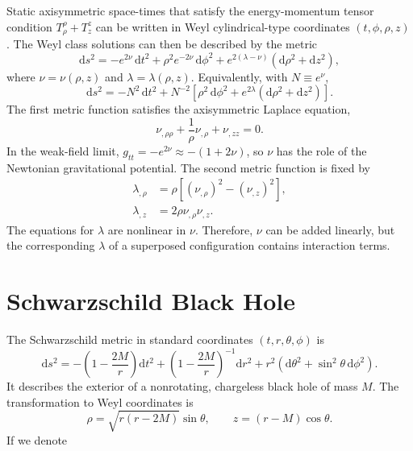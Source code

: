 Static axisymmetric space-times that satisfy the energy-momentum tensor condition $T_\rho^\rho + T^z_z$ can be written in Weyl cylindrical-type coordinates
\((t,\phi,\rho,z)\) \cite{Basovnik2010}. The Weyl class solutions can then be described by the metric
\begin{equation}
    \mathrm{d}s^2
    =
    -e^{2\nu}\,\mathrm{d}t^2
    +
    \rho^2 e^{-2\nu}\,\mathrm{d}\phi^2
    +
    e^{2(\lambda-\nu)}
    \left(
        \mathrm{d}\rho^2+\mathrm{d}z^2
    \right),
    \label{eq:weyl-metric}
\end{equation}
where \(\nu=\nu(\rho,z)\) and \(\lambda=\lambda(\rho,z)\). Equivalently,
with \(N\equiv e^\nu\),
\begin{equation}
    \mathrm{d}s^2
    =
    -N^2\,\mathrm{d}t^2
    +
    N^{-2}
    \left[
        \rho^2\,\mathrm{d}\phi^2
        +
        e^{2\lambda}
        \left(
            \mathrm{d}\rho^2+\mathrm{d}z^2
        \right)
    \right].
    \label{eq:weyl-metric-lapse}
\end{equation}
The first metric function satisfies the axisymmetric Laplace
equation,
\begin{equation}
    \nu_{,\rho\rho}
    +
    \frac{1}{\rho}\nu_{,\rho}
    +
    \nu_{,zz}
    =
    0.
    \label{eq:weyl-laplace}
\end{equation}
In the weak-field
limit, \(g_{tt}=-e^{2\nu}\approx -(1+2\nu)\), so \(\nu\) has the role of the
Newtonian gravitational potential. The second metric function is fixed by
\begin{align}
    \lambda_{,\rho}
    &=
    \rho
    \left[
        \left(\nu_{,\rho}\right)^2
        -
        \left(\nu_{,z}\right)^2
    \right],
    \label{eq:weyl-lambda-rho}
    \\
    \lambda_{,z}
    &=
    2\rho\nu_{,\rho}\nu_{,z}.
    \label{eq:weyl-lambda-z}
\end{align}
The equations for \(\lambda\) are nonlinear in \(\nu\). Therefore, $\nu$ can be added linearly, but the corresponding \(\lambda\) of a
superposed configuration contains interaction terms.
\cite{Sychrovsky2020,Kraus2025,Basovnik2010}

\section{Schwarzschild Black Hole}
\label{sec:schwarzschild-weyl}

The Schwarzschild metric in standard coordinates \((t,r,\theta,\phi)\) is
\begin{equation}
    \mathrm{d}s^2
    =
    -\left(1-\frac{2M}{r}\right)\mathrm{d}t^2
    +
    \left(1-\frac{2M}{r}\right)^{-1}\mathrm{d}r^2
    +
    r^2
    \left(
        \mathrm{d}\theta^2
        +
        \sin^2\theta\,\mathrm{d}\phi^2
    \right).
    \label{eq:schwarzschild-metric}
\end{equation}
It describes the exterior of a nonrotating, chargeless black hole of mass \(M\). The
transformation to Weyl coordinates is
\begin{equation}
    \rho
    =
    \sqrt{r(r-2M)}\sin\theta,
    \qquad
    z
    =
    (r-M)\cos\theta.
    \label{eq:schwarzschild-to-weyl}
\end{equation}
\cite{Semerak2016}
If we denote

